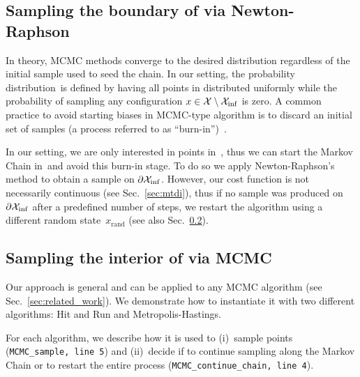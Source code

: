 \documentclass[letterpaper, 10 pt, conference]{ieeeconf}  %
\begin{document}
\subsection{Sampling the boundary of \Cinf via Newton-Raphson}
\label{subsec:grad}
In theory, MCMC methods converge to the desired distribution regardless of the initial sample used to seed the chain.
In our setting, the probability distribution~\Pinf is defined by having all points in \Cinf distributed uniformly
while 
the probability of sampling any configuration $x \in \mathcal{X} \setminus \mathcal{X}_{\rm {inf}}$ is zero.
A common practice to avoid starting biases in MCMC-type algorithm is to discard an initial set of samples (a process referred to as ``burn-in'')~\cite{ADDJ03}. 

In our setting, we are only interested in points in~\Cinf, thus we can start the Markov Chain in~\Cinf and avoid this burn-in stage. 
To do so we apply  Newton-Raphson's method to obtain a sample on $\partial \mathcal{X}_{\rm {inf}}$. 
However, our cost function is not necessarily continuous (see Sec.~\ref{sec:mtdi}), thus if no sample was produced on $\partial \mathcal{X}_{\rm {inf}}$ after a predefined number of steps, we restart the algorithm using a different random state~$x_\text{rand}$
(see also Sec.~\ref{subsec:mcmc}).


\subsection{Sampling the interior of \Cinf via MCMC}
\label{subsec:mcmc}

Our approach is general and can be applied to any MCMC algorithm (see Sec.~\ref{sec:related_work}).
We demonstrate how to instantiate it with two different algorithms: 
Hit and Run and Metropolis-Hastings.

For each algorithm, 
we describe how it is used to 
(i)~sample points 
(\texttt{MCMC\_sample, line 5})
and 
(ii)~decide if to continue sampling along the Markov Chain or to restart the entire process 
(\texttt{MCMC\_continue\_chain, line 4}).
 
\end{document}
